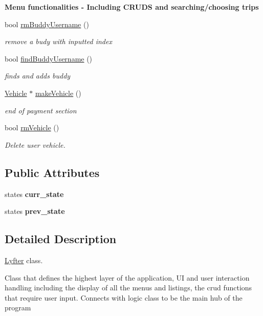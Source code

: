 \begin{Indent}{\bf Menu functionalities -\/ Including C\+R\+U\+D\+S and searching/choosing trips}
\begin{DoxyCompactItemize}
bool \hyperlink{class_lyfter_a899ee0ce766e90d8fae4aaba85bd55e0}{rm\+Buddy\+Username} ()
\begin{DoxyCompactList}\small\item\em remove a budy with inputted index \end{DoxyCompactList}\item 
bool \hyperlink{class_lyfter_a44f94095d4dee5f0aa72f2f006cf8cf1}{find\+Buddy\+Username} ()
\begin{DoxyCompactList}\small\item\em finds and adds buddy \end{DoxyCompactList}\item 
\hyperlink{class_vehicle}{Vehicle} $\ast$ \hyperlink{class_lyfter_ac4db1316849a3ba398c18e26121fcc88}{make\+Vehicle} ()
\begin{DoxyCompactList}\small\item\em end of payment section \end{DoxyCompactList}\item 
bool \hyperlink{class_lyfter_a1d40c249564dcd18149a3496841ad5d8}{rm\+Vehicle} ()
\begin{DoxyCompactList}\small\item\em Delete user vehicle. \end{DoxyCompactList}\end{DoxyCompactItemize}
\end{Indent}
\subsection*{Public Attributes}
\begin{DoxyCompactItemize}
\item 
\hypertarget{class_lyfter_af20bf300400934c0417a362e7987f691}{states {\bfseries curr\+\_\+state}}\label{class_lyfter_af20bf300400934c0417a362e7987f691}

\item 
\hypertarget{class_lyfter_a2302c66a77c787d94d256326f99a9286}{states {\bfseries prev\+\_\+state}}\label{class_lyfter_a2302c66a77c787d94d256326f99a9286}

\end{DoxyCompactItemize}


\subsection{Detailed Description}
\hyperlink{class_lyfter}{Lyfter} class. 

Class that defines the highest layer of the application, U\+I and user interaction handling including the display of all the menus and listings, the crud functions that require user input. Connects with logic class to be the main hub of the program 

